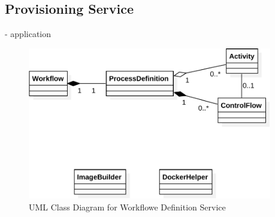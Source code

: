   \subsection{Provisioning Service} %
    \label{sub:provisioning_service}
      - application


\begin{figure}[htbp]
  \centering
  \includegraphics[width=0.95\textwidth]{content/images/class_d_definition-crop.pdf}
  \caption{UML Class Diagram for Workflowe Definition Service}
  \label{fig:uml_class_diagram_definition_service}
\end{figure}

